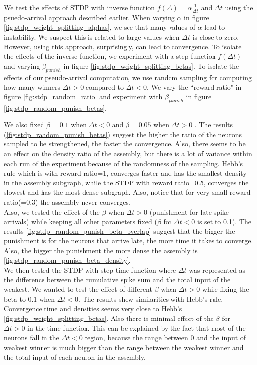 \documentclass{article}
\begin{document}
We test the effects of STDP with inverse function $f(\Delta) = \alpha \frac{1}{\Delta t}$ and $\Delta t$ using the psuedo-arrival approach described earlier. When varying $\alpha$ in figure \ref{fig:stdp_weight_splitting_alphas}, we see that many values of $\alpha$ lead to instability. We suspect this is related to large values when $\Delta t$ is close to zero. However, using this approach, surprisingly, can lead to convergence. To isolate the effects of the inverse function, we experiment with a step-function $f(\Delta t)$ and varying $\beta_{punish}$ in figure \ref{fig:stdp_weight_splitting_betas}.
To isolate the effects of our pseudo-arrival computation, we use random sampling for computing how many winners $\Delta t > 0$ compared to $\Delta t < 0$. We vary the ``reward ratio" in figure \ref{fig:stdp_random_ratio} and experiment with $\beta_{punish}$ in figure \ref{fig:stdp_random_punish_betas}. 

We also fixed $\beta=0.1$ when $\Delta t<0$ and $\beta=0.05$ when $\Delta t>0$ . The results (\ref{fig:stdp_random_punish_betas}) suggest the higher the ratio of the neurons sampled to be strengthened, the faster the convergence. Also, there seems to be an effect on the density ratio of the assembly, but there is a lot of variance within each run of the experiment because of the randomness of the sampling. Hebb’s rule which is with reward ratio=1, converges faster and has the smallest density in the assembly subgraph, while the STDP with reward ratio=0.5, converges the slowest and has the most dense subgraph. Also, notice that for very small reward ratio(=0.3) the assembly never converges. \\

Also, we tested the effect of the $\beta$ when $\Delta t>0$ (punishment for late spike arrivals) while keeping all other parameters fixed ($\beta$ for $\Delta t<0$ is set to 0.1). The results \ref{fig:stdp_random_punish_beta_overlap} suggest that the bigger the punishment is for the neurons that arrive late, the more time it takes to converge. Also, the bigger the punishment the more dense the assembly is \ref{fig:stdp_random_punish_beta_density}. \\

We then tested the STDP with step time function where $\Delta t$ was represented as the difference between the cumulative spike sum and the total input of the weakest. We wanted to test the effect of different $\beta$ when $\Delta t>0$ while fixing the beta to 0.1 when $\Delta t<0$. The results show similarities with Hebb’s rule. Convergence time and densities seems very close to Hebb’s \ref{fig:stdp_weight_splitting_betas}. Also there is minimal effect of the $\beta$ for $\Delta t>0$ in the time function. This can be explained by the fact that most of the neurons fall in the $\Delta t<0$ region, because the range between 0 and the input of weakest winner is much bigger than the range between the weakest winner and the total input of each neuron in the assembly.\\
\end{document}

